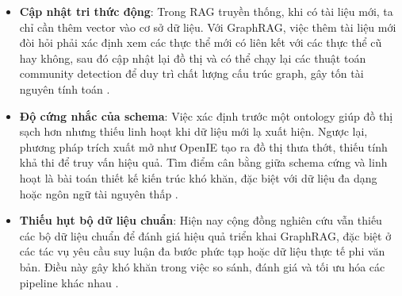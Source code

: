 \begin{itemize}
    \item \textbf{Cập nhật tri thức động}: Trong RAG truyền thống, khi có tài liệu mới, ta chỉ cần thêm vector vào cơ sở dữ liệu. Với GraphRAG, việc thêm tài liệu mới đòi hỏi phải xác định xem các thực thể mới có liên kết với các thực thể cũ hay không, sau đó cập nhật lại đồ thị và có thể chạy lại các thuật toán community detection để duy trì chất lượng cấu trúc graph, gây tốn tài nguyên tính toán \cite{pan2024unifying, edge2024global}.
    
    \item \textbf{Độ cứng nhắc của schema}: Việc xác định trước một ontology giúp đồ thị sạch hơn nhưng thiếu linh hoạt khi dữ liệu mới lạ xuất hiện. Ngược lại, phương pháp trích xuất mở như OpenIE tạo ra đồ thị thưa thớt, thiếu tính khả thi để truy vấn hiệu quả. Tìm điểm cân bằng giữa schema cứng và linh hoạt là bài toán thiết kế kiến trúc khó khăn, đặc biệt với dữ liệu đa dạng hoặc ngôn ngữ tài nguyên thấp \cite{pan2024unifying}.
    
    \item \textbf{Thiếu hụt bộ dữ liệu chuẩn}: Hiện nay cộng đồng nghiên cứu vẫn thiếu các bộ dữ liệu chuẩn để đánh giá hiệu quả triển khai GraphRAG, đặc biệt ở các tác vụ yêu cầu suy luận đa bước phức tạp hoặc dữ liệu thực tế phi văn bản. Điều này gây khó khăn trong việc so sánh, đánh giá và tối ưu hóa các pipeline khác nhau \cite{edge2024global, luo2024reasoning}.
\end{itemize}